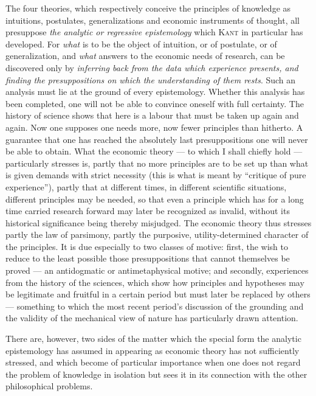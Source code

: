 \documentclass[12pt,a4paper]{book}
\newcommand{\opage}[1]{\marginnote{\footnotesize\textit{[#1]}}}
\begin{document}
The four theories, which respectively conceive the principles of knowledge as
intuitions, postulates, generalizations and economic instruments of thought, all
presuppose \emph{the analytic or regressive epistemology} which \textsc{Kant} in
particular has developed. For \emph{what} is to be the object of intuition, or
of postulate, or of generalization, and \emph{what} answers to the economic
needs of research, can be discovered only by \emph{inferring back from the data
which experience presents, and finding the presuppositions on which the
understanding of them rests}. Such an analysis must lie at the ground of every
epistemology. Whether this analysis has been completed, one will not be able to
convince oneself with full certainty. The history of science shows that here is
a labour that must be taken up again and again. Now one supposes one needs more,
now fewer principles than hitherto. A guarantee that one has reached the
absolutely last presuppositions one will never be able to obtain. What the
economic theory --- to which I shall chiefly hold --- particularly stresses is,
partly that no more principles are to be set up than what is given demands with
strict necessity (this is what is meant by ``critique of pure experience''),
partly that at different times, in different scientific situations, different
principles may be needed, so that even a principle which has for a long time
carried research forward may later be recognized as invalid, without its
historical significance being thereby misjudged. The economic theory thus
stresses partly the law of parsimony, partly the purposive, utility-determined
character of the principles. It is due especially to two classes of motive:
first, the wish to reduce \opage{34}to the least possible those presuppositions that
cannot themselves be proved --- an antidogmatic or antimetaphysical motive; and
secondly, experiences from the history of the sciences, which show how
principles and hypotheses may be legitimate and fruitful in a certain period but
must later be replaced by others --- something to which the most recent period's
discussion of the grounding and the validity of the mechanical view of nature
has particularly drawn attention.

There are, however, two sides of the matter which the special form the analytic
epistemology has assumed in appearing as economic theory has not sufficiently
stressed, and which become of particular importance when one does not regard the
problem of knowledge in isolation but sees it in its connection with the other
philosophical problems.
\end{document}
